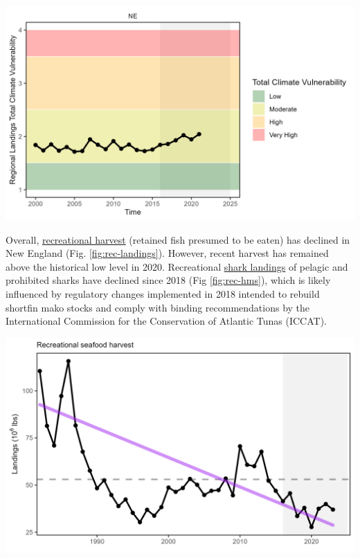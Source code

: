 \documentclass[
  10pt,
]{article}
\let\origfigure\figure
\let\endorigfigure\endfigure
\renewenvironment{figure}[1][2] {
    \expandafter\origfigure\expandafter[H]
} {
    \endorigfigure
}
\begin{document}
\begin{figure}

{\centering \includegraphics[width=6.5in]{images/NewEngland/climatevul_land_NewEngland_2025-09-09} 

}

\caption{Total climate vulnerability on New England landings from 2000 to 2022. Horizontal colored bars show different climate risk levels.}\label{fig:climatevul-land-48}
\end{figure}

Overall, \href{https://noaa-edab.github.io/catalog/recdat.html}{recreational harvest} (retained fish presumed to be eaten) has declined in New England (Fig. \ref{fig:rec-landings}). However, recent harvest has remained above the historical low level in 2020. Recreational \href{https://noaa-edab.github.io/catalog/rec_hms.html}{shark landings} of pelagic and prohibited sharks have declined since 2018 (Fig \ref{fig:rec-hms}), which is likely influenced by regulatory changes implemented in 2018 intended to rebuild shortfin mako stocks and comply with binding recommendations by the International Commission for the Conservation of Atlantic Tunas (ICCAT).

\begin{figure}

{\centering \includegraphics[width=6.5in]{images/NewEngland/rec_landings_NewEngland_2025-09-09} 

}

\caption{Total recreational seafood harvest (millions of pounds) in the New England region.}\label{fig:rec-landings-49}
\end{figure}
\end{document}
